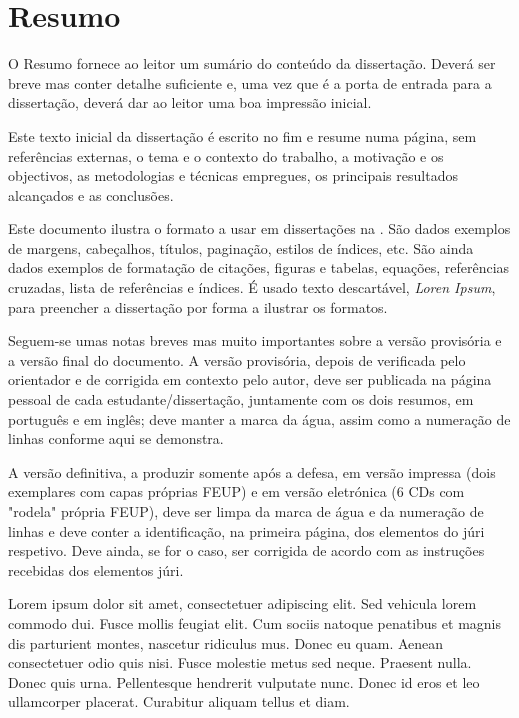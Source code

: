 \chapter*{Resumo}

O Resumo fornece ao leitor um sumário do conteúdo da dissertação.
Deverá ser breve mas conter detalhe suficiente e, uma vez que é a porta
de entrada para a dissertação, deverá dar ao leitor uma boa impressão
inicial.

Este texto inicial da dissertação é escrito no fim e resume numa
página, sem referências externas, o tema e o contexto do trabalho, a
motivação e os objectivos, as metodologias e técnicas empregues, os
principais resultados alcançados e as conclusões.

Este documento ilustra o formato a usar em dissertações na \Feup.
São dados exemplos de margens, cabeçalhos, títulos, paginação, estilos
de índices, etc.
São ainda dados exemplos de formatação de citações, figuras e tabelas,
equações, referências cruzadas, lista de referências e índices.
É usado texto descartável, \emph{Loren Ipsum}, para preencher a
dissertação por forma a ilustrar os formatos.

Seguem-se umas notas breves mas muito importantes sobre a versão
provisória e a versão final do documento.
A versão provisória, depois de verificada pelo orientador e de
corrigida em contexto pelo autor, deve ser publicada na página
pessoal de cada estudante/dissertação, juntamente com os dois
resumos, em português e em inglês; deve manter a marca da água,
assim como a numeração de linhas conforme aqui se demonstra.

A versão definitiva, a produzir somente após a defesa, em versão
impressa (dois exemplares com capas próprias FEUP) e em versão
eletrónica (6 CDs com "rodela" própria FEUP), deve ser limpa da marca de
água e da numeração de linhas e deve conter a identificação, na primeira
página, dos elementos do júri respetivo.
Deve ainda, se for o caso, ser corrigida de acordo com as instruções
recebidas dos elementos júri.

Lorem ipsum dolor sit amet, consectetuer adipiscing elit. Sed vehicula
lorem commodo dui. Fusce mollis feugiat elit. Cum sociis natoque
penatibus et magnis dis parturient montes, nascetur ridiculus
mus. Donec eu quam. Aenean consectetuer odio quis nisi. Fusce molestie
metus sed neque. Praesent nulla. Donec quis urna. Pellentesque
hendrerit vulputate nunc. Donec id eros et leo ullamcorper
placerat. Curabitur aliquam tellus et diam.

